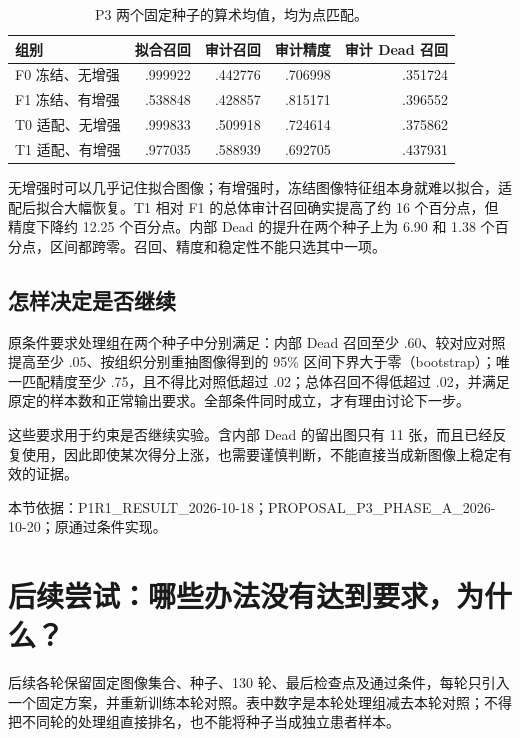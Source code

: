 \documentclass[UTF8,zihao=-4,fontset=windows]{ctexart}
\newcommand{\src}[1]{\par{\footnotesize\color{gray}本节依据：#1}\par}
\begin{document}
\begin{table}[H]\centering\small
\begin{tabular}{lrrrr}\toprule
组别 & 拟合召回 & 审计召回 & 审计精度 & 审计 Dead 召回\\\midrule
F0 冻结、无增强 & .999922 & .442776 & .706998 & .351724\\
F1 冻结、有增强 & .538848 & .428857 & .815171 & .396552\\
T0 适配、无增强 & .999833 & .509918 & .724614 & .375862\\
T1 适配、有增强 & .977035 & .588939 & .692705 & .437931\\\bottomrule
\end{tabular}
\caption{P3 两个固定种子的算术均值，均为点匹配。}
\end{table}

无增强时可以几乎记住拟合图像；有增强时，冻结图像特征组本身就难以拟合，适配后拟合大幅恢复。T1 相对 F1 的总体审计召回确实提高了约 16 个百分点，但精度下降约 12.25 个百分点。内部 Dead 的提升在两个种子上为 6.90 和 1.38 个百分点，区间都跨零。召回、精度和稳定性不能只选其中一项。

\subsection{怎样决定是否继续}

原条件要求处理组在两个种子中分别满足：内部 Dead 召回至少 .60、较对应对照提高至少 .05、按组织分别重抽图像得到的 95\% 区间下界大于零（bootstrap）；唯一匹配精度至少 .75，且不得比对照低超过 .02；总体召回不得低超过 .02，并满足原定的样本数和正常输出要求。全部条件同时成立，才有理由讨论下一步。

这些要求用于约束是否继续实验。含内部 Dead 的留出图只有 11 张，而且已经反复使用，因此即使某次得分上涨，也需要谨慎判断，不能直接当成新图像上稳定有效的证据。

\src{P1R1\_\allowbreak{}RESULT\_\allowbreak{}2026-10-18；PROPOSAL\_\allowbreak{}P3\_\allowbreak{}PHASE\_\allowbreak{}A\_\allowbreak{}2026-10-20；原通过条件实现。}

\section{后续尝试：哪些办法没有达到要求，为什么？}

后续各轮保留固定图像集合、种子、130 轮、最后检查点及通过条件，每轮只引入一个固定方案，并重新训练本轮对照。表中数字是本轮处理组减去本轮对照；不得把不同轮的处理组直接排名，也不能将种子当成独立患者样本。
\end{document}
